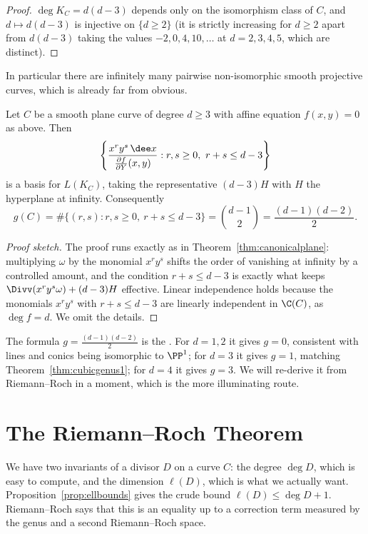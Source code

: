 \begin{proof}
	$\deg K_C = d(d-3)$ depends only on the isomorphism class of $C$, and $d \mapsto d(d-3)$ is injective on $\{d \geq 2\}$ (it is strictly increasing for $d \geq 2$ apart from $d(d-3)$ taking the values $-2,0,4,10,\dots$ at $d = 2,3,4,5$, which are distinct).
\end{proof}

In particular there are infinitely many pairwise non-isomorphic smooth projective curves, which is already far from obvious.

\begin{proposition}\label{prop:canonicalbasis}
	Let $C$ be a smooth plane curve of degree $d \geq 3$ with affine equation $f(x,y) = 0$ as above. Then
	$$\left\{\frac{x^ry^s\,\dee x}{\frac{\partial f}{\partial Y}(x,y)} : r,s \geq 0,\ r+s \leq d-3\right\}$$
	is a basis for $L(K_C)$, taking the representative $(d-3)H$ with $H$ the hyperplane at infinity. Consequently
	$$g(C) = \#\{(r,s) : r,s\geq0,\ r+s\leq d-3\} = \binom{d-1}{2} = \frac{(d-1)(d-2)}{2}.$$
\end{proposition}

\begin{proof}[Proof sketch]
	The proof runs exactly as in Theorem~\ref{thm:canonicalplane}: multiplying $\omega$ by the monomial $x^ry^s$ shifts the order of vanishing at infinity by a controlled amount, and the condition $r+s\leq d-3$ is exactly what keeps $\Divv(x^ry^s\omega) + (d-3)H$ effective. Linear independence holds because the monomials $x^ry^s$ with $r+s\leq d-3$ are linearly independent in $\C(C)$, as $\deg f = d$. We omit the details.
\end{proof}

The formula $g = \frac{(d-1)(d-2)}{2}$ is the . For $d = 1,2$ it gives $g = 0$, consistent with lines and conics being isomorphic to $\PP^1$; for $d = 3$ it gives $g = 1$, matching Theorem~\ref{thm:cubicgenus1}; for $d = 4$ it gives $g = 3$. We will re-derive it from Riemann--Roch in a moment, which is the more illuminating route.

\section{The Riemann--Roch Theorem}

We have two invariants of a divisor $D$ on a curve $C$: the degree $\deg D$, which is easy to compute, and the dimension $\ell(D)$, which is what we actually want. Proposition~\ref{prop:ellbounds} gives the crude bound $\ell(D)\leq\deg D + 1$. Riemann--Roch says that this is an equality up to a correction term measured by the genus and a second Riemann--Roch space.

